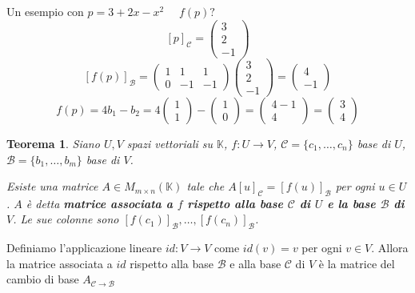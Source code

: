 \documentclass[a4paper]{article}
\newtheorem{theorem}{Teorema}
\theoremstyle{break}
\theoremstyle{break}
\theoremstyle{break}
\theoremstyle{break}
\begin{document}
\begin{example}
\vspace{1em}
Un esempio con \( p = 3 + 2x - x^2 \) \( \quad f(p)? \) 
\[
  [p]_{\mathcal{C}} = \begin{pmatrix} 
    3\\
    2\\
    -1
  \end{pmatrix}
\] 
\[
  [f(p)]_{\mathcal{B}} = \begin{pmatrix} 
    1 & 1 & 1\\
    0 & -1 & -1
  \end{pmatrix}
  \begin{pmatrix} 
    3\\
    2\\
    -1
  \end{pmatrix}
  = \begin{pmatrix} 
    4\\
    -1
  \end{pmatrix}
\] 
\[
f(p) = 4b_1 - b_2 = 4 \begin{pmatrix} 1\\1 \end{pmatrix} - \begin{pmatrix} 1\\0 \end{pmatrix}
= \begin{pmatrix} 
  4 - 1\\
  4
\end{pmatrix}  = \begin{pmatrix} 
3\\4
\end{pmatrix} 
\] 
\end{example}

\begin{theorem}
  Siano \( U,V \) spazi vettoriali su \( \mathbb{K} \), \( f: U \to V \), 
  \( \mathcal{C} = \{c_1, \ldots, c_n\}  \) base di \( U \), \( \mathcal{B} = \{b_1, \ldots, b_m\}  \)
  base di \( V \).

  \noindent Esiste una matrice \( A \in M_{m \times n}(\mathbb{K}) \) tale che \( A[u]_{\mathcal{C}} = [f(u)]_{\mathcal{B}} \) 
  per ogni \( u \in U \). \( A \) è detta \textbf{matrice associata a \( f \) rispetto
  alla base \( \mathcal{C} \) di \( U \) e la base \( \mathcal{B} \) di \( V \)}.
  Le sue colonne sono \( [f(c_1)]_{\mathcal{B}}, \ldots, [f(c_n)]_{\mathcal{B}} \).
\end{theorem}

\begin{example}
  Definiamo l'applicazione lineare \( id: V \to V \) come \( id(v) = v \) per ogni
  \( v \in V \). Allora la matrice associata a \( id \) rispetto alla base \( \mathcal{B} \)
  e alla base \( \mathcal{C} \) di \( V \) è la matrice del cambio di base \( A_{\mathcal{C} \to \mathcal{B}} \) 
\end{example}
\end{document}
